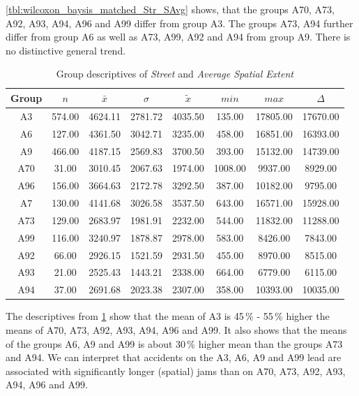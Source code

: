 \cref{tbl:wilcoxon_baysis_matched_Str_SAvg} shows, that the groups A70, A73, A92, A93, A94, A96 and A99 differ from group A3. The groups A73, A94 further differ from group A6 as well as A73, A99, A92 and A94 from group A9. There is no distinctive general trend.
\begin{table}[ht!]
	\tiny
	\centering
	\begin{tabular}{c|c|c|c|c|c|c|c}
	  	\toprule
	 	Group & $n$ & $\bar{x}$ & $\sigma$ & $\tilde{x}$ & $min$ & $max$ & $\Delta$ \\  
	  	\midrule
		A3 & 574.00 & 4624.11 & 2781.72 & 4035.50 & 135.00 & 17805.00 & 17670.00 \\ 
	  	A6 & 127.00 & 4361.50 & 3042.71 & 3235.00 & 458.00 & 16851.00 & 16393.00 \\ 
	  	A9 & 466.00 & 4187.15 & 2569.83 & 3700.50 & 393.00 & 15132.00 & 14739.00 \\ 
	  	A70 & 31.00 & 3010.45 & 2067.63 & 1974.00 & 1008.00 & 9937.00 & 8929.00 \\ 
	  	A96 & 156.00 & 3664.63 & 2172.78 & 3292.50 & 387.00 & 10182.00 & 9795.00 \\ 
	  	A7 & 130.00 & 4141.68 & 3026.58 & 3537.50 & 643.00 & 16571.00 & 15928.00 \\ 
	  	A73 & 129.00 & 2683.97 & 1981.91 & 2232.00 & 544.00 & 11832.00 & 11288.00 \\ 
	  	A99 & 116.00 & 3240.97 & 1878.87 & 2978.00 & 583.00 & 8426.00 & 7843.00 \\ 
	  	A92 & 66.00 & 2926.15 & 1521.59 & 2931.50 & 455.00 & 8970.00 & 8515.00 \\ 
	  	A93 & 21.00 & 2525.43 & 1443.21 & 2338.00 & 664.00 & 6779.00 & 6115.00 \\ 
	  	A94 & 37.00 & 2691.68 & 2023.38 & 2307.00 & 358.00 & 10393.00 & 10035.00 \\ 
	   	\bottomrule
	\end{tabular}
	\caption{Group descriptives of \textit{Street} and \textit{Average Spatial Extent}}
	\label{tbl:descriptives_baysis_matched_Str_SAvg}
\end{table}
The descriptives from \cref{tbl:descriptives_baysis_matched_Str_SAvg} show that the mean of A3 is 45\,\% - 55\,\% higher the means of A70, A73, A92, A93, A94, A96 and A99. It also shows that the means of the groups A6, A9 and A99 is about 30\,\% higher mean than the groups A73 and A94. We can interpret that accidents on the A3, A6, A9 and A99 lead are associated with significantly longer (spatial) jams than on A70, A73, A92, A93, A94, A96 and A99.

